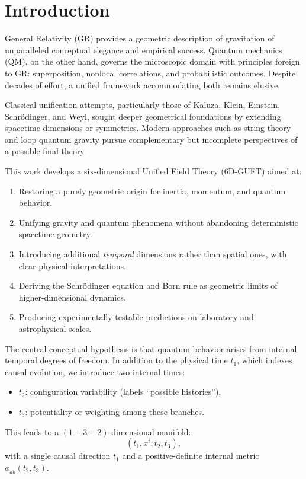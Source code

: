 \documentclass[12pt]{article}
\begin{document}
\section{Introduction}

General Relativity (GR) provides a geometric description of gravitation of 
unparalleled conceptual elegance and empirical success. Quantum mechanics (QM), 
on the other hand, governs the microscopic domain with principles foreign to 
GR: superposition, nonlocal correlations, and probabilistic outcomes. Despite 
decades of effort, a unified framework accommodating both remains elusive.

Classical unification attempts, particularly those of Kaluza, Klein, 
Einstein, Schrödinger, and Weyl, sought deeper geometrical foundations by 
extending spacetime dimensions or symmetries. Modern approaches such as string 
theory and loop quantum gravity pursue complementary but incomplete 
perspectives of a possible final theory.

This work develops a six-dimensional Unified Field Theory (6D-GUFT) aimed at:
\begin{enumerate}
\item Restoring a purely geometric origin for inertia, momentum, and quantum 
behavior.
\item Unifying gravity and quantum phenomena without abandoning deterministic 
spacetime geometry.
\item Introducing additional \emph{temporal} dimensions rather than spatial 
ones, with clear physical interpretations.
\item Deriving the Schrödinger equation and Born rule as geometric limits of 
higher-dimensional dynamics.
\item Producing experimentally testable predictions on laboratory and 
astrophysical scales.
\end{enumerate}

The central conceptual hypothesis is that quantum behavior arises from internal 
temporal degrees of freedom. In addition to the physical time \(t_1\), which 
indexes causal evolution, we introduce two internal times:
\begin{itemize}
\item \(t_2\): configuration variability (labels ``possible histories''),
\item \(t_3\): potentiality or weighting among these branches.
\end{itemize}

This leads to a \((1+3+2)\)-dimensional manifold:
\[
(t_1, x^i; t_2, t_3),
\]
with a single causal direction \(t_1\) and a positive-definite internal metric 
\(\phi_{ab}(t_2,t_3)\).
\end{document}
